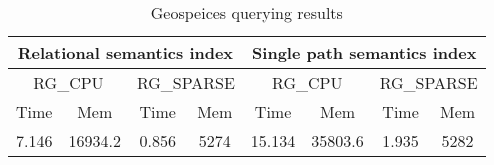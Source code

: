 {\setlength{\tabcolsep}{0.4em}
\begin{table*}[h]
\caption{Geospeices querying results}
\label{tbl:tableGeospeicesResults}
\begin{tabular}{| c  c | c  c | c  c | c  c |}
    \hline
    
    \multicolumn{4}{|c|}{Relational semantics index}	&	\multicolumn{4}{|c|}{Single path semantics index} \\    
    
    \hline
    
    
    \multicolumn{2}{|c|}{RG\_CPU}	&	\multicolumn{2}{|c|}{RG\_SPARSE} & \multicolumn{2}{|c|}{RG\_CPU}	&	\multicolumn{2}{|c|}{RG\_SPARSE}	 \\
     Time & Mem & Time & Mem & Time & Mem & Time & Mem \\    
    \hline
    \hline
    7.146 & 16934.2 & 0.856 & 5274 & 15.134 & 35803.6 & 1.935 & 5282   \\
    \hline
  \end{tabular}
\end{table*}
}

